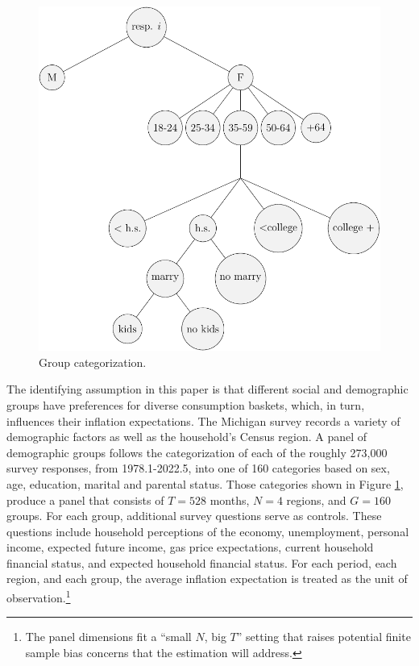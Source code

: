 \documentclass[12pt]{article}
\begin{document}
\begin{figure}
\centering
\caption{Group categorization.}\label{fig:GroupTree}
\includegraphics[height = \textwidth, width = \textwidth]{figs/GroupCat}
\end{figure}

The identifying assumption in this paper is that different social and demographic groups have preferences for diverse consumption baskets, which, in turn, influences their inflation expectations. The Michigan survey records a variety of demographic factors as well as the household's Census region. A panel of demographic groups follows the categorization of each of the roughly 273,000 survey responses, from 1978.1-2022.5, into one of 160 categories based on sex, age, education, marital and parental status. Those categories shown in Figure \ref{fig:GroupTree}, produce a panel that consists of $T = 528$ months, $N = 4$ regions, and $G=160$ groups. For each group, additional survey questions serve as controls. These questions include household perceptions of the economy, unemployment, personal income, expected future income, gas price expectations, current household financial status, and expected household financial status. For each period, each region, and each group, the average inflation expectation is treated as the unit of observation.\footnote{The panel dimensions fit a ``small $N$, big $T$'' setting that raises potential finite sample bias concerns that the estimation will address.}
\end{document}
